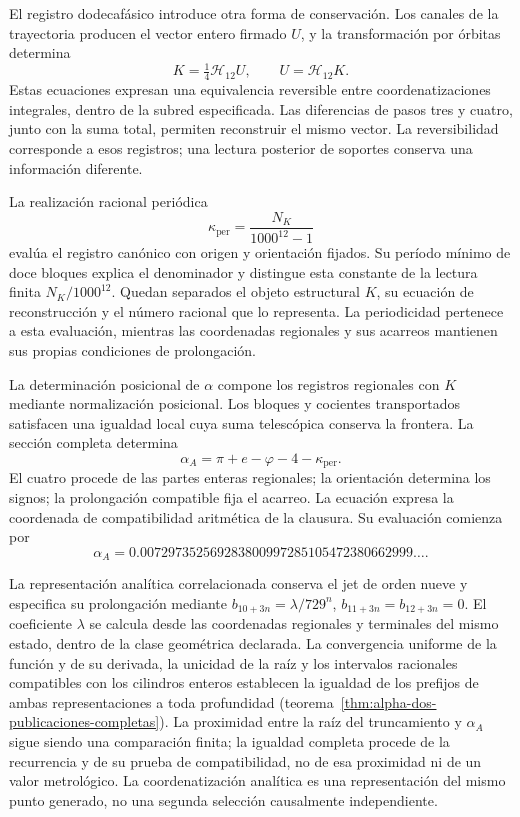 El registro dodecafásico introduce otra forma de conservación. Los canales de la trayectoria producen el vector entero firmado \(U\), y la transformación por órbitas determina
\[
 K=\tfrac14\mathcal H_{12}U,\qquad U=\mathcal H_{12}K.
\]
Estas ecuaciones expresan una equivalencia reversible entre coordenatizaciones integrales, dentro de la subred especificada. Las diferencias de pasos tres y cuatro, junto con la suma total, permiten reconstruir el mismo vector. La reversibilidad corresponde a esos registros; una lectura posterior de soportes conserva una información diferente.

La realización racional periódica
\[
 \kappa_{\mathrm{per}}=\frac{N_K}{1000^{12}-1}
\]
evalúa el registro canónico con origen y orientación fijados. Su período mínimo de doce bloques explica el denominador y distingue esta constante de la lectura finita \(N_K/1000^{12}\). Quedan separados el objeto estructural \(K\), su ecuación de reconstrucción y el número racional que lo representa. La periodicidad pertenece a esta evaluación, mientras las coordenadas regionales y sus acarreos mantienen sus propias condiciones de prolongación.

La determinación posicional de \(\alpha\) compone los registros regionales con \(K\) mediante normalización posicional. Los bloques y cocientes transportados satisfacen una igualdad local cuya suma telescópica conserva la frontera. La sección completa determina
\[
 \alpha_A=\pi+e-\varphi-4-\kappa_{\mathrm{per}}.
\]
El cuatro procede de las partes enteras regionales; la orientación determina los signos; la prolongación compatible fija el acarreo. La ecuación expresa la coordenada de compatibilidad aritmética de la clausura. Su evaluación comienza por
\[
 \alpha_A=0.007297352569283800997285105472380662999\ldots.
\]

La representación analítica correlacionada conserva el jet de orden nueve
y especifica su prolongación mediante
\(b_{10+3n}=\lambda/729^n\), \(b_{11+3n}=b_{12+3n}=0\).
El coeficiente \(\lambda\) se calcula desde las coordenadas regionales y
terminales del mismo estado, dentro de la clase geométrica declarada.
La convergencia uniforme de la función y de su derivada, la unicidad de la
raíz y los intervalos racionales compatibles con los cilindros enteros
establecen la igualdad de los prefijos de ambas representaciones a toda profundidad
(teorema~\ref{thm:alpha-dos-publicaciones-completas}). La proximidad entre
la raíz del truncamiento y \(\alpha_A\) sigue siendo una comparación finita;
la igualdad completa procede de la recurrencia y de su prueba de
compatibilidad, no de esa proximidad ni de un valor metrológico.
La coordenatización analítica es una representación del mismo punto generado,
no una segunda selección causalmente independiente.

